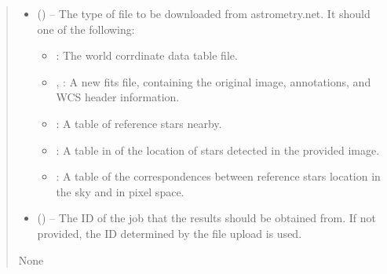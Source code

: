 \documentclass[letterpaper,11pt,english]{sphinxmanual}
\begin{document}
\begin{savenotes}
\begin{fulllineitems}
\begin{savenotes}
\begin{fulllineitems}
\begin{quote}
\begin{description}
\begin{itemize}
\item {} 
\sphinxAtStartPar
{} () – 
\sphinxAtStartPar
The type of file to be downloaded from astrometry.net. It should
one of the following:
\begin{itemize}
\item {} 
\sphinxAtStartPar
{}: The world corrdinate data table file.

\item {} 
\sphinxAtStartPar
{}, : A new fits file, containing the
original image, annotations, and WCS header information.

\item {} 
\sphinxAtStartPar
{}: A table of reference stars nearby.

\item {} 
\sphinxAtStartPar
{}: A table in of the location of stars detected in the
provided image.

\item {} 
\sphinxAtStartPar
{}: A table of the correspondences between reference
stars location in the sky and in pixel space.

\end{itemize}


\item {} 
\sphinxAtStartPar
{} (\sphinxstyleliteralemphasis{\sphinxupquote{, }}) – The ID of the job that the results should be obtained from. If not
provided, the ID determined by the file upload is used.

\end{itemize}

\sphinxAtStartPar
None

\end{description}\end{quote}

\end{fulllineitems}\end{savenotes}



\end{fulllineitems}
\end{savenotes}
\end{document}

